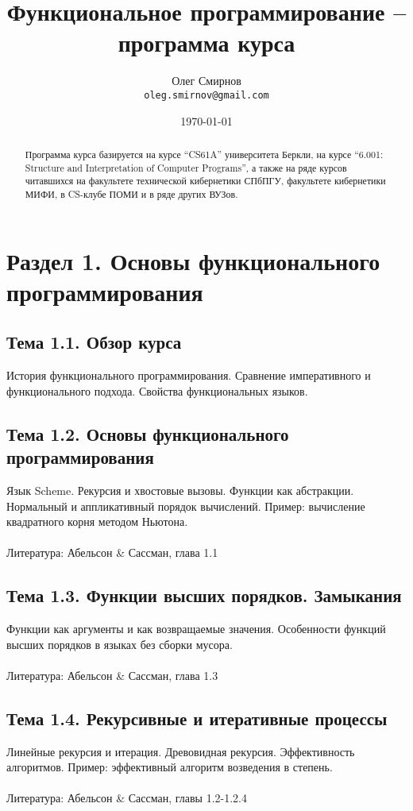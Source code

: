 \documentclass[a4paper,11pt]{article}
\author{Олег Смирнов \\
\texttt{oleg.smirnov@gmail.com}}
\date{\today}
\title{Функциональное программирование -- программа курса}
\begin{document}
\maketitle

\begin{abstract}
Программа курса базируется на курсе ``CS61A'' университета Беркли, на курсе
``6.001: Structure and Interpretation of Computer Programs'', а также на ряде
курсов читавшихся на факультете технической кибернетики СПбПГУ, 
факультете кибернетики МИФИ, в CS-клубе ПОМИ и в ряде других ВУЗов.
\end{abstract}

\section*{Раздел 1. Основы функционального программирования}

\subsection*{Тема 1.1. Обзор курса}
История функционального программирования. Сравнение императивного и
функционального подхода. Свойства функциональных языков.

\subsection*{Тема 1.2. Основы функционального программирования}
Язык Scheme. Рекурсия и хвостовые вызовы. Функции как абстракции. 
Нормальный и аппликативный порядок вычислений. Пример: вычисление 
квадратного корня методом Ньютона. 
\\\\
Литература: Абельсон \& Сассман, глава 1.1

\subsection*{Тема 1.3. Функции высших порядков. Замыкания}
Функции как аргументы и как возвращаемые значения. Особенности функций
высших порядков в языках без сборки мусора.
\\\\
Литература: Абельсон \& Сассман, глава 1.3

\subsection*{Тема 1.4. Рекурсивные и итеративные процессы}
Линейные рекурсия и итерация. Древовидная рекурсия. Эффективность алгоритмов.
Пример: эффективный алгоритм возведения в степень.
\\\\
Литература: Абельсон \& Сассман, главы 1.2-1.2.4
\end{document}
